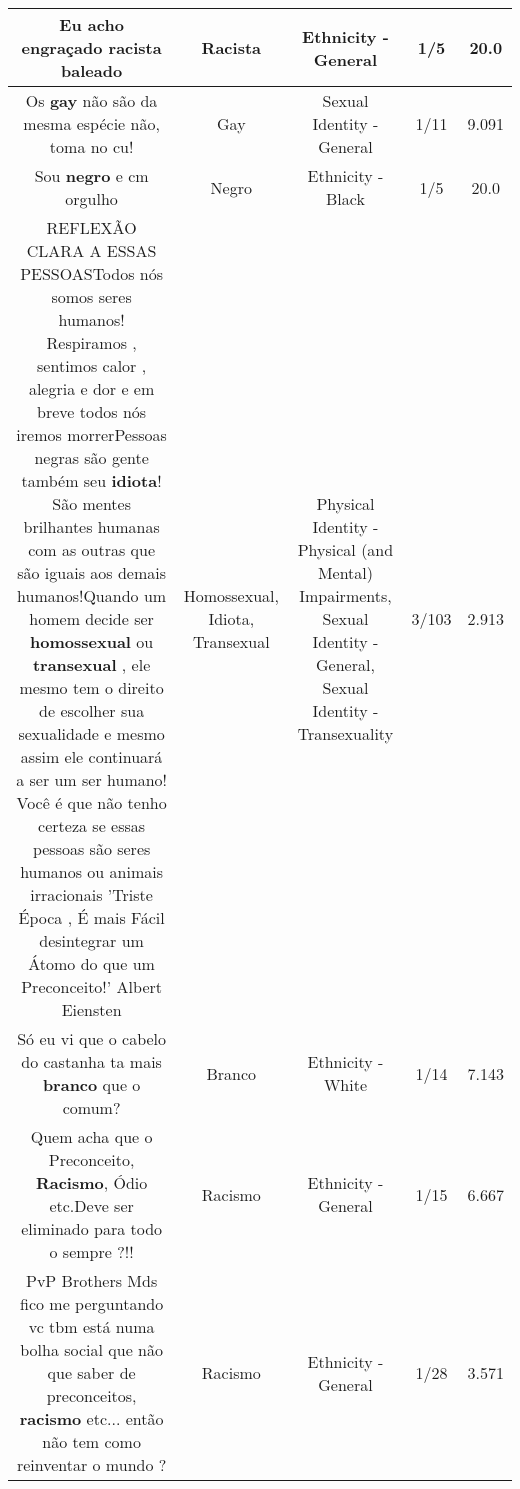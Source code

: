 \documentclass[11pt]{article}
\newlength\mylength
\begin{document}
\begin{center}
\begin{longtable}{|C{.65\mylength}|C{.30\mylength}|C{.12\mylength}|C{.12\mylength}|C{.12\mylength}|}
  \small Eu acho engraçado \textbf{racista} baleado\normalsize   & Racista & Ethnicity - General & 1/5 & 20.0 \\  \hline
  \small Os \textbf{gay} não são da mesma espécie não, toma no cu!\normalsize   & Gay & Sexual Identity - General & 1/11 & 9.091 \\  \hline
  \small Sou \textbf{negro} e cm orgulho\normalsize   & Negro & Ethnicity - Black & 1/5 & 20.0 \\  \hline
  \small REFLEXÃO CLARA A ESSAS PESSOASTodos nós somos seres humanos! Respiramos , sentimos calor , alegria e dor e em breve todos nós iremos morrerPessoas negras são gente também seu \textbf{idiota}! São mentes brilhantes humanas com as outras que são iguais aos demais humanos!Quando um homem decide ser \textbf{homossexual} ou \textbf{transexual} , ele mesmo tem o direito de escolher sua sexualidade e mesmo assim ele continuará a ser um ser humano! Você é que não tenho certeza se essas pessoas são seres humanos ou animais irracionais 'Triste Época , É mais Fácil desintegrar um Átomo do que um Preconceito!' Albert Eiensten\normalsize   & Homossexual, Idiota, Transexual & Physical Identity - Physical (and Mental) Impairments, Sexual Identity - General, Sexual Identity - Transexuality & 3/103 & 2.913 \\  \hline
  \small Só eu vi que o cabelo do castanha ta mais \textbf{branco} que o comum?\normalsize   & Branco & Ethnicity - White & 1/14 & 7.143 \\  \hline
  \small Quem acha que o Preconceito, \textbf{Racismo}, Ódio etc.Deve ser eliminado para todo o sempre ?!!\normalsize   & Racismo & Ethnicity - General & 1/15 & 6.667 \\  \hline
  \small PvP Brothers Mds fico me perguntando vc tbm está numa bolha social que não que saber de preconceitos, \textbf{racismo} etc... então não tem como reinventar o mundo ?\normalsize   & Racismo & Ethnicity - General & 1/28 & 3.571 \\  \hline

\end{longtable}
\end{center}
\end{document}
